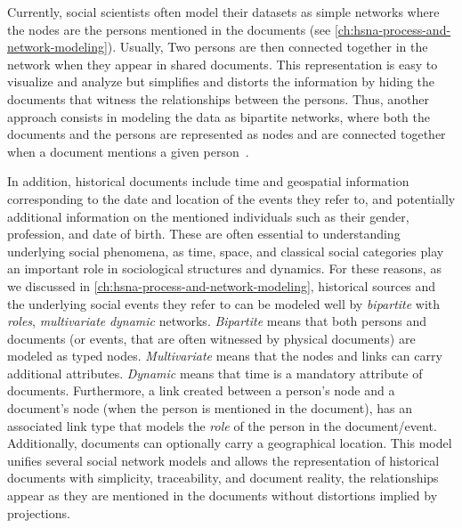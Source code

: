 Currently, social scientists often model their datasets as simple networks where the nodes are the persons mentioned in the documents (see \autoref{ch:hsna-process-and-network-modeling}).
Usually, Two persons are then connected together in the network when they appear in shared documents.
This representation is easy to visualize and analyze but simplifies and distorts the information by hiding the documents that witness the relationships between the persons.
Thus, another approach consists in modeling the data as bipartite networks, where both the documents and the persons are represented as nodes and are connected together when a document mentions a given person~\cite{grandjeanAnalisiVisualizzazioniReti2017, rossiExplorationLargeDatabase2014, shafieHypergraphRepresentationsStudy2017}.

In addition, historical documents include time and geospatial information corresponding to the date and location of the events they refer to, and potentially additional information on the mentioned individuals such as their gender, profession, and date of birth.
These are often essential to understanding underlying social phenomena, as time, space, and classical social categories play an important role in sociological structures and dynamics\cite{lemercier12FormalNetwork2015}.
For these reasons, as we discussed in \autoref{ch:hsna-process-and-network-modeling}, historical sources and the underlying social events they refer to can be modeled well by \emph{bipartite} with \emph{roles},  \emph{multivariate} \emph{dynamic} networks. \emph{Bipartite} means that both persons and documents (or events, that are often witnessed by physical documents) are modeled as typed nodes. \emph{Multivariate} means that the nodes and links can carry additional attributes. \emph{Dynamic} means that time is a mandatory attribute of documents.
Furthermore, a link created between a person's node and a document's node (when the person is mentioned in the document), has an associated link type that models the \emph{role} of the person in the document/event.
Additionally, documents can optionally carry a geographical location.
This model unifies several social network models and allows the representation of historical documents with simplicity, traceability, and document reality, \ie the relationships appear as they are mentioned in the documents without distortions implied by projections\cite{cristofoliAuxSourcesGrands2008}.

